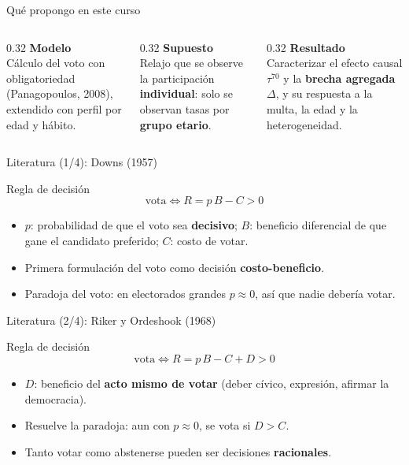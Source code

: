 \documentclass[aspectratio=169,11pt,xcolor=table]{beamer}
\newcommand{\hl}[1]{\textcolor{upaccent}{\textbf{#1}}}
\begin{document}
\begin{frame}{Qué propongo en este curso}
  \begin{columns}[T]
    \begin{column}{0.32\textwidth}\centering
      {\color{upaccent}\Large\bfseries Modelo}\\[0.15cm]\small Cálculo del voto con obligatoriedad (Panagopoulos, 2008), extendido con perfil por edad y hábito.
    \end{column}
    \begin{column}{0.32\textwidth}\centering
      {\color{upaccent}\Large\bfseries Supuesto}\\[0.15cm]\small Relajo que se observe la participación \textbf{individual}: solo se observan tasas por \textbf{grupo etario}.
    \end{column}
    \begin{column}{0.32\textwidth}\centering
      {\color{upaccent}\Large\bfseries Resultado}\\[0.15cm]\small Caracterizar el efecto causal $\tau^{70}$ y la \textbf{brecha agregada} $\Delta$, y su respuesta a la multa, la edad y la heterogeneidad.
    \end{column}
  \end{columns}
\end{frame}

\begin{frame}{Literatura (1/4): Downs (1957)}
  \begin{block}{Regla de decisión}
    \[ \text{vota} \iff R = p\,B - C > 0 \]
  \end{block}
  \vspace{0.2cm}
  \begin{itemize}
    \item $p$: probabilidad de que el voto sea \hl{decisivo}; $B$: beneficio diferencial de que gane el candidato preferido; $C$: costo de votar.
    \item Primera formulación del voto como decisión \textbf{costo-beneficio}.
    \item \alert{Paradoja del voto}: en electorados grandes $p\approx 0$, así que nadie debería votar.
  \end{itemize}
\end{frame}

\begin{frame}{Literatura (2/4): Riker y Ordeshook (1968)}
  \begin{block}{Regla de decisión}
    \[ \text{vota} \iff R = p\,B - C + D > 0 \]
  \end{block}
  \vspace{0.2cm}
  \begin{itemize}
    \item $D$: beneficio del \hl{acto mismo de votar} (deber cívico, expresión, afirmar la democracia).
    \item Resuelve la paradoja: aun con $p\approx 0$, se vota si $D>C$.
    \item Tanto votar como abstenerse pueden ser decisiones \textbf{racionales}.
  \end{itemize}
\end{frame}
\end{document}
